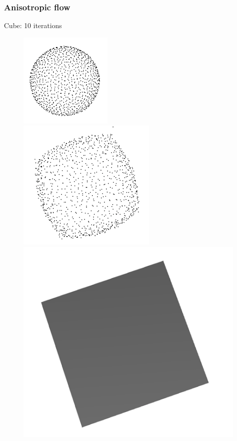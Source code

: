 \documentclass{beamer}
\begin{document}
\begin{frame}
    \frametitle{Anisotropic flow}

    Cube: 10 iterations
    \begin{figure}
        \centering
        \includegraphics[scale=0.4]{img/sphere-cube-0}
        \includegraphics[scale=0.3]{img/sphere-cube-10}
        \includegraphics[scale=0.2]{img/sphere-cube-cube}
    \end{figure}


\end{frame}
\end{document}
